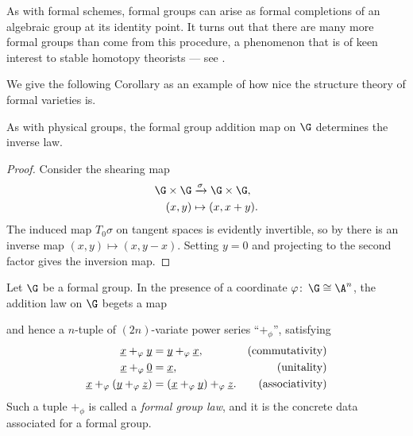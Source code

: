 \begin{remark}
As with formal schemes, formal groups can arise as formal completions of an algebraic group at its identity point.  It turns out that there are many more formal groups than come from this procedure, a phenomenon that is of keen interest to stable homotopy theorists --- see .
\end{remark}

We give the following Corollary as an example of how nice the structure theory of formal varieties is.

\begin{corollary}
As with physical groups, the formal group addition map on $\G$ determines the inverse law.
\end{corollary}
\begin{proof}
Consider the shearing map
\begin{align*}
\G \times \G & \xrightarrow{\sigma} \G \times \G, \\
(x, y) & \mapsto (x, x + y).
\end{align*}
The induced map $T_0 \sigma$ on tangent spaces is evidently invertible, so by  there is an inverse map $(x, y) \mapsto (x, y - x)$.  Setting $y = 0$ and projecting to the second factor gives the inversion map.
\end{proof}



\begin{definition}\label{FGLDefinition}
Let $\G$ be a formal group.  In the presence of a coordinate $\phi \co \G \cong \A^n$, the addition law on $\G$ begets a map
\begin{center}
 
\end{center}
and hence a $n$-tuple of $(2n)$-variate power series ``$+_\phi$'', satisfying
\begin{align*}
\underline{\smash x} +_\phi \underline{\smash y} & = \underline{\smash y} +_\phi \underline{\smash x}, & \text{(commutativity)} \\
\underline{\smash x} +_\phi \underline{\smash 0} & = \underline{\smash x}, & \text{(unitality)} \\
\underline{\smash x} +_\phi (\underline{\smash y} +_\phi \underline{\smash z}) & = (\underline{\smash x} +_\phi \underline{\smash y}) +_\phi \underline{\smash z}. & \text{(associativity)}
\end{align*}
Such a tuple $+_\phi$ is called a \textit{formal group law}, and it is the concrete data associated for a formal group.
\end{definition}

